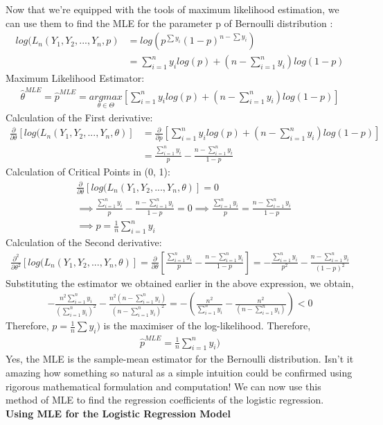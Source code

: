 Now that we’re equipped with the tools of maximum likelihood estimation, we can use them to find the MLE for the parameter p of Bernoulli distribution :
\begin{align*}
    log(L_n(Y_1,Y_2, ...,Y_n,p) &= log(p^{\sum y_i}(1-p)^{n-\sum y_i})\\
    &= \sum_{i=1}^n y_i log(p) + \left( n - \sum_{i=1}^n y_i\right)log(1-p)
\end{align*}
Maximum Likelihood Estimator:
\begin{align*}
    \boxed{\hat{\theta}^{MLE} = \hat{p}^{MLE} = \underset{\theta\in\Theta}{argmax}\left[ \sum_{i=1}^n y_i log(p) + \left( n - \sum_{i=1}^n y_i\right)log(1-p)\right]}
\end{align*}
Calculation of the First derivative:
\begin{align*}
    \frac{\partial}{\partial\theta}[log(L_n(Y_1,Y_2, ...,Y_n,\theta)] &= \frac{\partial}{\partial p}\left[ \sum_{i=1}^n y_i log(p) + \left( n - \sum_{i=1}^n y_i\right)log(1-p)\right] \\&= \frac{\sum_{i=1}^n y_i}{p} - \frac{n-\sum_{i=1}^n y_i}{1-p}
\end{align*}
Calculation of Critical Points in (0, 1):
\begin{align*}
    &\frac{\partial}{\partial\theta}[log(L_n(Y_1,Y_2, ...,Y_n,\theta)] = 0\\
    &\implies\frac{\sum_{i=1}^n y_i}{p} - \frac{n-\sum_{i=1}^n y_i}{1-p} = 0 \implies \frac{\sum_{i=1}^n y_i}{p} = \frac{n-\sum_{i=1}^n y_i}{1-p} \\
    &\implies p = \frac{1}{n}\sum_{i=1}^n y_i
\end{align*}
Calculation of the Second derivative:
\begin{align*}
    \frac{\partial^2}{\partial\theta^2}[log(L_n(Y_1,Y_2, ...,Y_n,\theta)] = \frac{\partial}{\partial\theta}\left[ \frac{\sum_{i=1}^n y_i}{p} - \frac{n-\sum_{i=1}^n y_i}{1-p}\right] = -\frac{\sum_{i=1}^n y_i}{p^2} - \frac{n-\sum_{i=1}^n y_i}{(1-p)^2}
\end{align*}
Substituting the estimator we obtained earlier in the above expression, we obtain,
\begin{align*}
    -\frac{n^2\sum_{i=1}^n y_i}{(\sum_{i=1}^n y_i)^2}-\frac{n^2(n-\sum_{i=1}^n y_i)}{(n-\sum_{i=1}^n y_i)^2} = -\left( \frac{n^2}{\sum_{i=1}^n y_i} - \frac{n^2}{(n-\sum_{i=1}^n y_i)}\right) < 0
\end{align*}
Therefore, $p = \frac{1}{n}\sum y_i)$ is the maximiser of the log-likelihood.
Therefore,
\begin{align*}
    \hat{p}^{MLE} = \frac{1}{n}\sum_{i=1}^n y_i)
\end{align*}
Yes, the MLE is the sample-mean estimator for the Bernoulli distribution. Isn’t it amazing how something so natural as a simple intuition could be confirmed using rigorous mathematical formulation and computation! We can now use this method of MLE to find the regression coefficients of the logistic regression.
\\\textbf{\Large Using MLE for the Logistic Regression Model}

